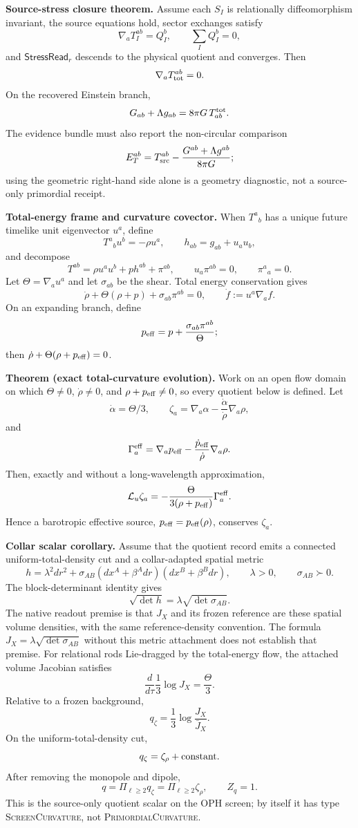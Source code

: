 \textbf{Source-stress closure theorem.}\label{thm:oph-source-stress-closure}
Assume each \(S_I\) is relationally diffeomorphism invariant, the source
equations hold, sector exchanges satisfy
\[
\nabla_aT_I^{ab}=Q_I^b,\qquad \sum_I Q_I^b=0,
\]
and \(\mathsf{StressRead}_r\) descends to the physical quotient and converges.
Then
\[
\nabla_aT_{\rm tot}^{ab}=0.
\]
On the recovered Einstein branch,
\[
G_{ab}+\Lambda g_{ab}=8\pi G\,T^{\rm tot}_{ab}.
\]
The evidence bundle must also report the non-circular comparison
\[
E_T^{ab}=
T_{\rm src}^{ab}
-
\frac{G^{ab}+\Lambda g^{ab}}{8\pi G};
\]
using the geometric right-hand side alone is a geometry diagnostic, not a
source-only primordial receipt.

\textbf{Total-energy frame and curvature covector.}
When \(T^a{}_b\) has a unique future timelike unit eigenvector \(u^a\), define
\[
T^a{}_bu^b=-\rho u^a,\qquad
h_{ab}=g_{ab}+u_au_b,
\]
and decompose
\[
T^{ab}=\rho u^au^b+p h^{ab}+\pi^{ab},
\qquad
u_a\pi^{ab}=0,\qquad \pi^a{}_a=0.
\]
Let \(\Theta=\nabla_a u^a\) and let \(\sigma_{ab}\) be the shear.  Total
energy conservation gives
\[
\dot\rho+\Theta(\rho+p)+\sigma_{ab}\pi^{ab}=0,
\qquad
\dot f:=u^a\nabla_a f.
\]
On an expanding branch, define
\[
p_{\rm eff}=p+\frac{\sigma_{ab}\pi^{ab}}{\Theta};
\]
then \(\dot\rho+\Theta(\rho+p_{\rm eff})=0\).

\textbf{Theorem (exact total-curvature evolution).}\label{thm:oph-total-curvature-evolution}
Work on an open flow domain on which
\(\Theta\ne0\), \(\dot\rho\ne0\), and
\(\rho+p_{\rm eff}\ne0\), so every quotient below is defined. Let
\[
\dot\alpha=\Theta/3,\qquad
\zeta_a=\nabla_a\alpha-\frac{\dot\alpha}{\dot\rho}\nabla_a\rho,
\]
and
\[
\Gamma^{\rm eff}_a=
\nabla_a p_{\rm eff}
-
\frac{\dot p_{\rm eff}}{\dot\rho}\nabla_a\rho .
\]
Then, exactly and without a long-wavelength approximation,
\[
\mathcal L_u\zeta_a
=
-\frac{\Theta}{3(\rho+p_{\rm eff})}\Gamma^{\rm eff}_a .
\]
Hence a barotropic effective source, \(p_{\rm eff}=p_{\rm eff}(\rho)\),
conserves \(\zeta_a\).

\textbf{Collar scalar corollary.}\label{cor:oph-collar-curvature}
Assume that the quotient record emits a connected uniform-total-density cut and a
collar-adapted spatial metric
\[
 h=\lambda^2dr^2+
 \sigma_{AB}(dx^A+\beta^A dr)(dx^B+\beta^B dr),
 \qquad \lambda>0,\qquad \sigma_{AB}\succ0.
\]
The block-determinant identity gives
\[
 \sqrt{\det h}=\lambda\sqrt{\det\sigma_{AB}}.
\]
The native readout premise is that \(J_X\) and its frozen reference are these
spatial volume densities, with the same reference-density convention.  The
formula \(J_X=\lambda\sqrt{\det\sigma_{AB}}\) without this metric attachment
does not establish that premise.  For relational rods Lie-dragged by the
total-energy flow, the attached volume Jacobian satisfies
\[
\frac{d}{d\tau}\frac13\log J_X=\frac{\Theta}{3}.
\]
Relative to a frozen background,
\[
q_\zeta=\frac13\log\frac{J_X}{\bar J_X}.
\]
On the uniform-total-density cut,
\[
q_\zeta=\zeta_\rho+\hbox{constant}.
\]
After removing the monopole and dipole,
\[
q=\Pi_{\ell\ge2}q_\zeta=\Pi_{\ell\ge2}\zeta_\rho,
\qquad
Z_q=1.
\]
This is the source-only quotient scalar on the OPH screen; by itself it has type
\textsc{ScreenCurvature}, not \textsc{PrimordialCurvature}.

